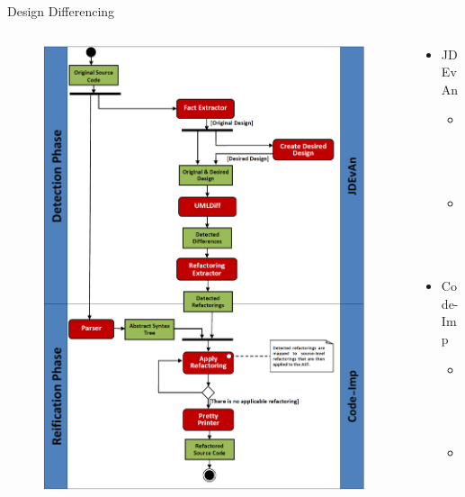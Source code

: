 \documentclass{beamer}
\begin{document}
\begin{frame}{Design Differencing}
	\begin{columns}[T]
		\begin{column}{.5\textwidth}
			\begin{figure}[t]
				\centering
				\includegraphics[width=0.8\linewidth]{bilder/designdiff.png}
			\end{figure}
		\end{column}
		\begin{column}{.5\textwidth}
			\begin{itemize}
				\item JDEvAn
				\begin{itemize}
					\item Item
					\item Item
				\end{itemize}
				\item Code-Imp
				\begin{itemize}
					\item Item
					\item Item
				\end{itemize}
			\end{itemize}
		\end{column}
	\end{columns}	
\end{frame}
\end{document}
